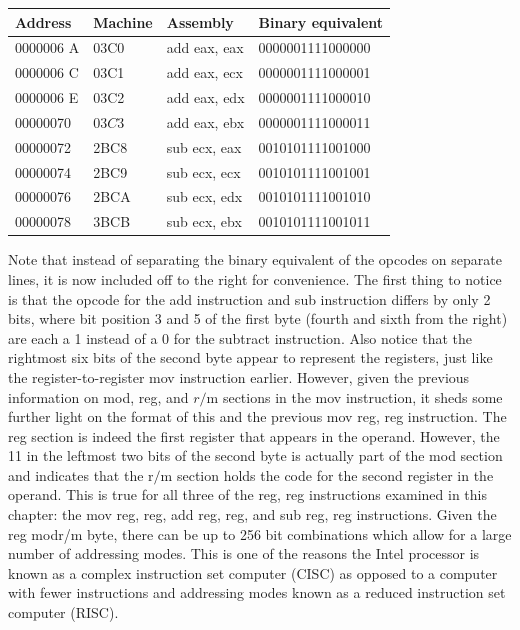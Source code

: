 \documentclass[10pt]{book}
\begin{document}
\begin{center}
\begin{tabular}{|l|l|l|l|}
\hline
Address & Machine & Assembly & Binary equivalent \\
\hline
0000006 A & 03C0 & add eax, eax & 0000001111000000 \\
\hline
0000006 C & 03C1 & add eax, ecx & 0000001111000001 \\
\hline
0000006 E & 03C2 & add eax, edx & 0000001111000010 \\
\hline
00000070 & $03 C 3$ & add eax, ebx & 0000001111000011 \\
\hline
00000072 & 2BC8 & sub ecx, eax & 0010101111001000 \\
\hline
00000074 & 2BC9 & sub ecx, ecx & 0010101111001001 \\
\hline
00000076 & 2BCA & sub ecx, edx & 0010101111001010 \\
\hline
00000078 & 3BCB & sub ecx, ebx & 0010101111001011 \\
\hline
\end{tabular}
\end{center}

Note that instead of separating the binary equivalent of the opcodes on separate lines, it is now included off to the right for convenience. The first thing to notice is that the opcode for the add instruction and sub instruction differs by only 2 bits, where bit position 3 and 5 of the first byte (fourth and sixth from the right) are each a 1 instead of a 0 for the subtract instruction. Also notice that the rightmost six bits of the second byte appear to represent the registers, just like the register-to-register mov instruction earlier. However, given the previous information on mod, reg, and $r / \mathrm{m}$ sections in the mov instruction, it sheds some further light on the format of this and the previous mov reg, reg instruction. The reg section is indeed the first register that appears in the operand. However, the 11 in the leftmost two bits of the second byte is actually part of the mod section and indicates that the $\mathrm{r} / \mathrm{m}$ section holds the code for the second register in the operand. This is true for all three of the reg, reg instructions examined in this chapter: the mov reg, reg, add reg, reg, and sub reg, reg instructions.
Given the reg modr/m byte, there can be up to 256 bit combinations which allow for a large number of addressing modes. This is one of the reasons the Intel processor is known as a complex instruction set computer (CISC) as opposed to a computer with fewer instructions and addressing modes known as a reduced instruction set computer (RISC).
\end{document}
